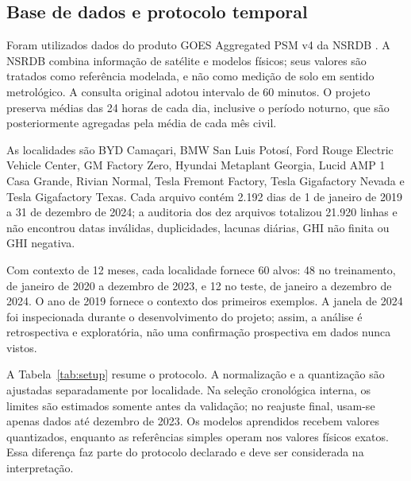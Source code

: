 \documentclass[10pt,conference,a4paper]{IEEEtran}
\begin{document}
\subsection{Base de dados e protocolo temporal}

Foram utilizados dados do produto GOES Aggregated PSM v4 da NSRDB
\cite{sengupta2018,nlr2026}. A NSRDB combina informação de satélite e modelos
físicos; seus valores são tratados como referência modelada, e não como
medição de solo em sentido metrológico. A consulta original adotou intervalo de
60 minutos. O projeto preserva médias das 24 horas de cada dia, inclusive o
período noturno, que são posteriormente agregadas pela média de cada mês civil.

As localidades são BYD Camaçari, BMW San Luis Potosí, Ford Rouge Electric
Vehicle Center, GM Factory Zero, Hyundai Metaplant Georgia, Lucid AMP 1 Casa
Grande, Rivian Normal, Tesla Fremont Factory, Tesla Gigafactory Nevada e Tesla
Gigafactory Texas. Cada arquivo contém 2.192 dias de 1 de janeiro de 2019 a 31
de dezembro de 2024; a auditoria dos dez arquivos totalizou 21.920 linhas e não
encontrou datas inválidas, duplicidades, lacunas diárias, GHI não finita ou GHI
negativa.

Com contexto de 12 meses, cada localidade fornece 60 alvos: 48 no treinamento,
de janeiro de 2020 a dezembro de 2023, e 12 no teste, de janeiro a dezembro de
2024. O ano de 2019 fornece o contexto dos primeiros exemplos. A janela de 2024
foi inspecionada durante o desenvolvimento do projeto; assim, a análise é
retrospectiva e exploratória, não uma confirmação prospectiva em dados nunca
vistos.

A Tabela~\ref{tab:setup} resume o protocolo. A normalização e a quantização são
ajustadas separadamente por localidade. Na seleção cronológica interna, os
limites são estimados somente antes da validação; no reajuste final, usam-se
apenas dados até dezembro de 2023. Os modelos aprendidos recebem valores
quantizados, enquanto as referências simples operam nos valores físicos exatos.
Essa diferença faz parte do protocolo declarado e deve ser considerada na
interpretação.
\end{document}
